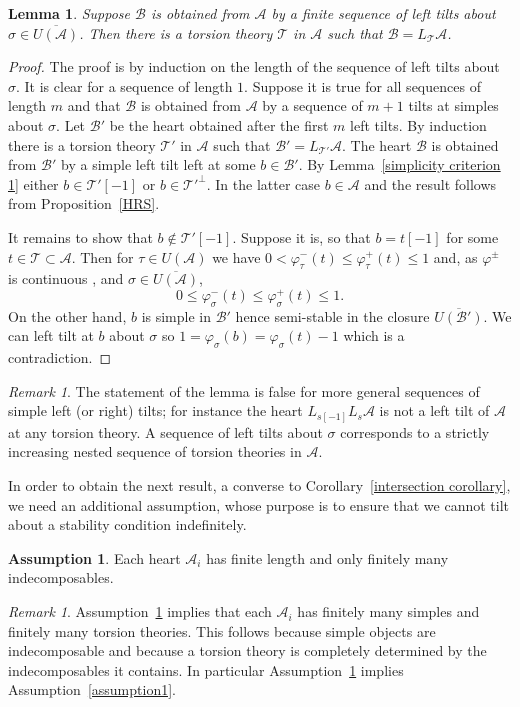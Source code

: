 \documentclass{article}
\theoremstyle{plain}
\newtheorem{lemma}[theorem]{Lemma}     %
\theoremstyle{definition}
\newtheorem{assumption}{Assumption}
\theoremstyle{remark}
\newtheorem{remark}[theorem]{Remark}
\newcommand{\cat}[1]{\mathcal{#1}}
\begin{document}
\begin{lemma}
\label{tilting about stratum}
Suppose $\cat{B}$ is obtained from $\cat{A}$ by a finite sequence of left tilts about  $\sigma\in \overline{U(\cat{A})}$. Then there is a torsion theory $\cat{T}$ in $\cat{A}$ such that $\cat{B} = L_{\cat{T}}\cat{A}$. 
\end{lemma}
\begin{proof}
The proof is by induction on the length of the sequence of left tilts about $\sigma$. It is clear for a sequence of length $1$. Suppose it is true for  all sequences of length $m$ and that $\cat{B}$ is obtained from $\cat{A}$ by a sequence of $m+1$ tilts at simples about $\sigma$. Let $\cat{B}'$ be the heart obtained after the first $m$ left tilts. By induction there is a torsion theory $\cat{T}'$ in $\cat{A}$ such that $\cat{B}' = L_{\cat{T}'}\cat{A}$. The heart $\cat{B}$ is obtained from $\cat{B}'$ by a simple left tilt left at some $b\in \cat{B}'$. By Lemma~\ref{simplicity criterion 1}  either $b \in \cat{T}'[-1]$ or $b\in {\cat{T}'}^\perp$. In the latter case $b \in \cat{A}$ and the result follows from Proposition~\ref{HRS}.

It remains to show that $b \not \in  \cat{T}'[-1]$. Suppose it is, so that $b=t[-1]$ for some $t\in \cat{T} \subset \cat{A}$. Then for $\tau \in U(\cat{A})$ we have
$0< \varphi_\tau^-(t) \leq \varphi_\tau^+(t) \leq 1$
and, as $\varphi^\pm$ is continuous \cite[Proposition 8.1]{MR2373143}, and $\sigma\in\overline{U(\cat{A})}$, $$0\leq \varphi_\sigma^-(t) \leq \varphi_\sigma^+(t) \leq 1.$$ On the other hand, $b$ is simple in $\cat{B}'$ hence semi-stable in the closure $\overline{U(\cat{B}')}$. We can left tilt at $b$ about $\sigma$ so $1=\varphi_\sigma(b)=\varphi_\sigma(t)-1$ which is a contradiction.
\end{proof}
\begin{remark}
\label{nested remark}
The statement of the lemma is false for more general sequences of simple left (or right) tilts; for instance the heart $L_{s[-1]}L_s\cat{A}$ is not a left tilt of $\cat{A}$ at any torsion theory. A sequence of left tilts about $\sigma$ corresponds to a strictly increasing nested sequence of torsion theories in $\cat{A}$.
\end{remark}
In order to obtain the next result, a converse to Corollary~\ref{intersection corollary}, we need an additional assumption, whose purpose is to ensure that we cannot tilt  about a stability condition indefinitely.
\begin{assumption}
\label{assumption2}
Each heart $\cat{A}_i$ has 
finite length and
only finitely many indecomposables. 
\end{assumption}
\begin{remark}
Assumption~\ref{assumption2} implies that each $\cat{A}_i$ has 
finitely many simples and finitely many torsion theories. 
This follows because simple objects are indecomposable and because a torsion theory is completely determined by the indecomposables it contains. 
In particular Assumption~\ref{assumption2} implies Assumption~\ref{assumption1}.
\end{remark}
\end{document}
